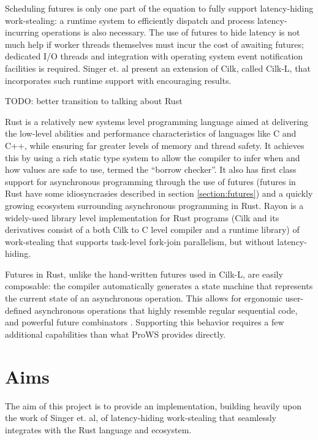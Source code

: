 \documentclass[bsc,frontabs,singlespacing,parskip,deptreport,normalheadings]{infthesis}
\begin{document}
Scheduling futures is only one part of the equation to fully support
latency-hiding work-stealing: a runtime system to efficiently dispatch and
process latency-incurring operations is also necessary. The use of futures to
hide latency is not much help if worker threads themselves must incur the cost
of awaiting futures; dedicated I/O threads and integration with operating system
event notification facilities is required. Singer et. al
\cite{singer_scheduling_2019} present an extension of Cilk, called Cilk-L, that
incorporates such runtime support with encouraging results.

TODO: better transition to talking about Rust

Rust \cite{matsakis_rust_2014} is a relatively new systems level programming
language aimed at delivering the low-level abilities and performance
characteristics of languages like C and C++, while ensuring far greater levels
of memory and thread safety. It achieves this by using a rich static type
system to allow the compiler to infer when and how values are safe to use,
termed the ``borrow checker''. It also has first class support for asynchronous
programming through the use of futures (futures in Rust have some idiosyncrasies
described in section \ref{section:futures}) and a quickly growing
ecosystem surrounding asynchronous programming in Rust. Rayon
\cite{noauthor_rayon_2022, noauthor_baby_nodate, stone_how_2021} is a
widely-used library level implementation for Rust programs (Cilk and its
derivatives consist of a both Cilk to C level compiler and a runtime library) of
work-stealing that supports task-level fork-join parallelism, but without
latency-hiding.

Futures in Rust, unlike the hand-written futures used in Cilk-L, are easily
composable: the compiler automatically generates a state machine that represents
the current state of an asynchronous operation. This allows for ergonomic
user-defined asynchronous operations that highly resemble regular sequential
code, and powerful future combinators \cite{noauthor_futuresfuture_nodate}.
Supporting this behavior requires a few additional capabilities than what ProWS
provides directly.

\section{Aims}

The aim of this project is to provide an implementation, building heavily upon
the work of Singer et. al, of latency-hiding work-stealing that seamlessly
integrates with the Rust language and ecosystem.
\end{document}
